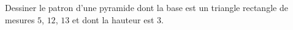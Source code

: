 
\begin{exercice}\label{exo2smath-0190}

    Dessiner le patron d'une pyramide dont la base est un triangle rectangle de mesures \( 5\), \( 12\), \( 13\) et dont la hauteur est \( 3\). 

\end{exercice}
